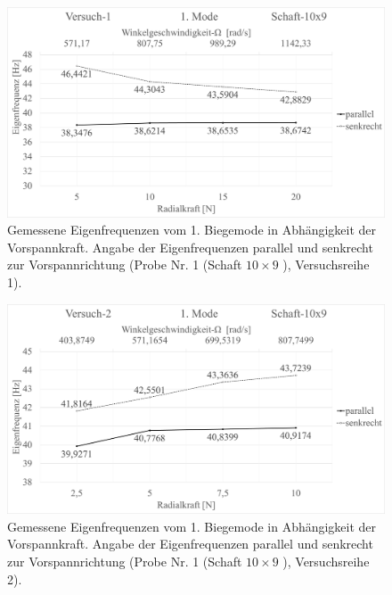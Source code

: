 	
	\begin{figure}[H]
		\centering
		\includegraphics[width=0.95\linewidth, height=0.36\textheight]{Ergebnisse/Schaft_10x9_1Mode_ver1} 
		\caption{Gemessene Eigenfrequenzen vom 1. Biegemode in Abhängigkeit der Vorspannkraft. Angabe der Eigenfrequenzen parallel und senkrecht zur Vorspannrichtung (Probe Nr. 1 (Schaft $ 10\times9 $ ), Versuchsreihe 1).}
		\label{fig:Result-Schaft-10x9-1Mode-Ver1}
	\end{figure}
	
	\begin{figure}[H]
		\centering
		\includegraphics[width=0.95\linewidth, height=0.36\textheight]{Ergebnisse/Schaft_10x9_1Mode_ver2} 
		\caption{Gemessene Eigenfrequenzen vom 1. Biegemode in Abhängigkeit der Vorspannkraft. Angabe der Eigenfrequenzen parallel und senkrecht zur Vorspannrichtung (Probe Nr. 1 (Schaft $ 10\times9 $ ), Versuchsreihe 2).}
		\label{fig:Result-Schaft-10x9-1Mode-Ver2}
	\end{figure}

